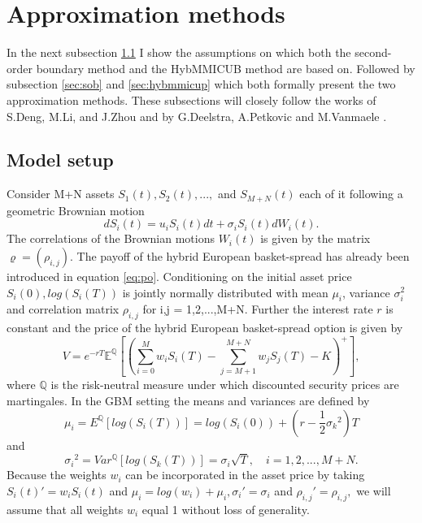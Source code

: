 \documentclass[a4paper]{article}
\begin{document}
\newpage
\section{Approximation methods}
\label{sec:am}
In the next subsection \ref{sec:ms} I show the assumptions on which both the second-order boundary method and the HybMMICUB method are based on. Followed by subsection \ref{sec:sob} and \ref{sec:hybmmicup} which both formally present the two approximation methods. These subsections will closely follow the works of S.Deng, M.Li, and J.Zhou \cite{sob} and by G.Deelstra, A.Petkovic and M.Vanmaele \cite{hybmmicub}.

\subsection{Model setup}
\label{sec:ms}
Consider M+N assets $S_1(t), S_2(t), ...,$ and $S_{M+N}(t)$ each of it following a geometric Brownian motion
$$dS_i(t) = u_iS_i(t)dt + \sigma_iS_i(t)dW_i(t).$$
The correlations of the Brownian motions $W_i(t)$ is given by the matrix $\varrho=(\rho_{i,j})$. 
The payoff of the hybrid European basket-spread has already been introduced in equation \ref{eq:po}. Conditioning on the initial asset price $S_i(0), log(S_i(T))$ is jointly normally distributed with mean $\mu_i$, variance $\sigma_i^2$ and correlation matrix $\rho_{i,j}$ for i,j = 1,2,...,M+N. 
Further the interest rate $r$ is constant and the price of the hybrid European basket-spread option is given by
\begin{equation}
\label{eq:mg}
V = e^{-rT}\mathbb{E}^{\mathbb{Q}}[(\sum_{i=0}^M w_iS_i(T) - \sum_{j=M+1}^{M+N} w_jS_j(T) - K)^+],
\end{equation}
where $\mathbb{Q}$ is the risk-neutral measure under which discounted security prices are martingales.
In the GBM setting the means and variances are defined by 
$$\mu_i = E^\mathbb{Q}[log(S_i(T))] = log(S_i(0)) + (r-\frac{1}{2}{\sigma_k}^2)T$$ 
and
$${\sigma_i}^2 = Var^\mathbb{Q}[log(S_k(T))] = \sigma_i\sqrt{T}, \quad i=1,2,...,M+N.$$
Because the weights $w_i$ can be incorporated in the asset price by taking $S_i(t)'=w_iS_i(t)$ and $\mu_i=log(w_i)+\mu_i, \sigma_i'=\sigma_i$ and $\rho_{i,j}'=\rho_{i,j},$ we will assume that all weights $w_i$ equal 1 without loss of generality.
\end{document}
